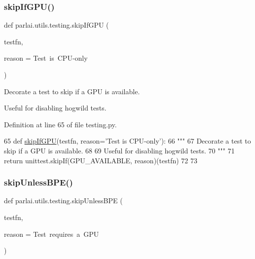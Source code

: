 \subsubsection{\texorpdfstring{skip\+If\+G\+P\+U()}{skipIfGPU()}}
{\footnotesize\ttfamily def parlai.\+utils.\+testing.\+skip\+If\+G\+PU (\begin{DoxyParamCaption}\item[{}]{testfn,  }\item[{}]{reason = {\ttfamily \textquotesingle{}Test~is~CPU-\/only\textquotesingle{}} }\end{DoxyParamCaption})}

\begin{DoxyVerb}Decorate a test to skip if a GPU is available.

Useful for disabling hogwild tests.
\end{DoxyVerb}
 

Definition at line 65 of file testing.\+py.


\begin{DoxyCode}
65 \textcolor{keyword}{def }\hyperlink{namespaceparlai_1_1utils_1_1testing_a2d3bb5013e210bf866032aedc812859b}{skipIfGPU}(testfn, reason='Test is CPU-only'):
66     \textcolor{stringliteral}{"""}
67 \textcolor{stringliteral}{    Decorate a test to skip if a GPU is available.}
68 \textcolor{stringliteral}{}
69 \textcolor{stringliteral}{    Useful for disabling hogwild tests.}
70 \textcolor{stringliteral}{    """}
71     \textcolor{keywordflow}{return} unittest.skipIf(GPU\_AVAILABLE, reason)(testfn)
72 
73 
\end{DoxyCode}
\mbox{\label{namespaceparlai_1_1utils_1_1testing_ab04af7a525a569f29b936b54b32899b7}} 
\subsubsection{\texorpdfstring{skip\+Unless\+B\+P\+E()}{skipUnlessBPE()}}
{\footnotesize\ttfamily def parlai.\+utils.\+testing.\+skip\+Unless\+B\+PE (\begin{DoxyParamCaption}\item[{}]{testfn,  }\item[{}]{reason = {\ttfamily \textquotesingle{}Test~requires~a~GPU\textquotesingle{}} }\end{DoxyParamCaption})}

